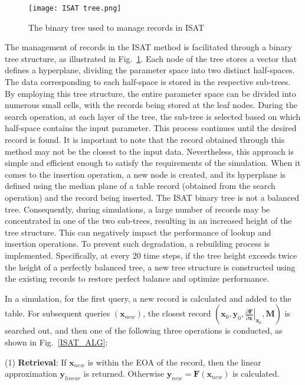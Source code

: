 \begin{figure}[htbp]
\centering
\texttt{[image: ISAT tree.png]}
\caption{The binary tree used to manage records in ISAT}
\label{ISAT_tree} 
\end{figure}
The management of records in the ISAT method is facilitated through a binary tree structure, as illustrated in Fig.~\ref{ISAT_tree}. Each node of the tree stores a vector that defines a hyperplane, dividing the parameter space into two distinct half-spaces. The data corresponding to each half-space is stored in the respective sub-trees. By employing this tree structure, the entire parameter space can be divided into numerous small cells, with the records being stored at the leaf nodes. During the search operation, at each layer of the tree, the sub-tree is selected based on which half-space contains the input parameter. This process continues until the desired record is found. It is important to note that the record obtained through this method may not be the closest to the input data. Nevertheless, this approach is simple and efficient enough to satisfy the requirements of the simulation. When it comes to the insertion operation, a new node is created, and its hyperplane is defined using the median plane of a table record (obtained from the search operation) and the record being inserted. The ISAT binary tree is not a balanced tree.  Consequently, during simulations, a large number of records may be concentrated in one of the two sub-trees, resulting in an increased height of the tree structure. This can negatively impact the performance of lookup and insertion operations. To prevent such degradation, a rebuilding process is implemented. Specifically, at every 20 time steps, if the tree height exceeds twice the height of a perfectly balanced tree, a new tree structure is constructed using the existing records to restore perfect balance and optimize performance.



In a simulation, for the first query, a new record is calculated and added to the table. 
For subsequent queries $(\mathbf{x}_{new})$, the closest record $(\mathbf{x}_0,\mathbf{y}_0,\left.\frac{\partial \mathbf{F}}{\partial \mathbf{x}}\right|_{\mathbf{x}_0}, \mathbf{M})$ is searched out, and then one of the following three operations is conducted, as shown in Fig.~\ref{ISAT_ALG}:

(1) \textbf{Retrieval}: If $\mathbf{x}_{new}$ is within the EOA of the record, then the linear approximation $\mathbf{y}_{linear}$ is returned. Otherwise $\mathbf{y}_{new}=\mathbf{F}\left(\mathbf{x}_{new}\right)$ is calculated. 

